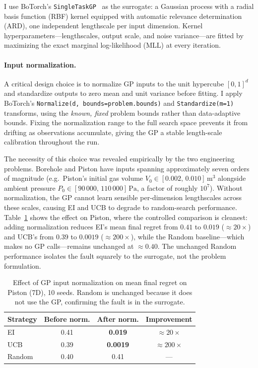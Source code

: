 I use BoTorch's \texttt{SingleTaskGP}~\citep{balandat2020botorch} as
the surrogate: a Gaussian process with a radial basis function (RBF)
kernel equipped with automatic relevance determination (ARD), one
independent lengthscale per input dimension.
Kernel hyperparameters—lengthscales, output scale, and noise
variance—are fitted by maximizing the exact marginal log-likelihood
(MLL) at every iteration.

\paragraph{Input normalization.}
A critical design choice is to normalize GP inputs to the unit
hypercube $[0,1]^d$ and standardize outputs to zero mean and unit
variance before fitting.
I apply BoTorch's \texttt{Normalize(d,\,bounds=problem.bounds)} and
\texttt{Standardize(m=1)} transforms, using the \emph{known, fixed}
problem bounds rather than data-adaptive bounds.
Fixing the normalization range to the full search space prevents it
from drifting as observations accumulate, giving the GP a stable
length-scale calibration throughout the run.

The necessity of this choice was revealed empirically by the two
engineering problems.
Borehole and Piston have inputs spanning approximately seven orders of
magnitude (e.g.\ Piston's initial gas volume
$V_0 \in [0.002,\,0.010]\,\mathrm{m}^3$ alongside ambient pressure
$P_0 \in [90\,000,\,110\,000]\,\mathrm{Pa}$, a factor of roughly
$10^7$).
Without normalization, the GP cannot learn sensible per-dimension
lengthscales across these scales, causing EI and UCB to degrade to
random-search performance.
Table~\ref{tab:normalization} shows the effect on Piston, where the
controlled comparison is cleanest: adding normalization reduces EI's
mean final regret from $0.41$ to $0.019$ (${\approx}20{\times}$) and
UCB's from $0.39$ to $0.0019$ (${\approx}200{\times}$), while the
Random baseline—which makes no GP calls—remains unchanged at
${\approx}0.40$.
The unchanged Random performance isolates the fault squarely to the
surrogate, not the problem formulation.

\begin{table}[h]
\centering
\caption{Effect of GP input normalization on mean final regret on
  Piston (7D), 10 seeds.  Random is unchanged because it does not use
  the GP, confirming the fault is in the surrogate.}
\label{tab:normalization}
\begin{tabular}{lccc}
\toprule
Strategy & Before norm. & After norm. & Improvement \\
\midrule
EI       & 0.41  & \textbf{0.019}  & ${\approx}20{\times}$  \\
UCB      & 0.39  & \textbf{0.0019} & ${\approx}200{\times}$ \\
Random   & 0.40  & 0.41            & —                      \\
\bottomrule
\end{tabular}
\end{table}

